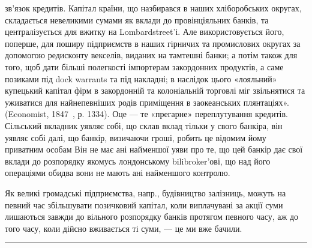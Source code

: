 зв’язок кредитів. Капітал країни, що назбирався в наших хліборобських
округах, складається невеликими сумами як вклади до провінціяльних банків,
та централізується для вжитку на Lombardstreet’i. Але використовується його,
поперше, для поширу підприємств в наших гірничих та промислових округах за
допомогою редисконту векселів, виданих на тамтешні банки; а потім також для того,
щоб дати більші полегкості імпортерам закордонних продуктів, а саме позиками
під dock warrants та під накладні; в наслідок цього «лояльний» купецький
капітал фірм в закордонній та колоніальній торговлі міг звільнятися та уживатися
для найнепевніших родів приміщення в заокеанських плянтаціях». (Economist,
1847~, р. 1334). Оце — те «прегарне» переплутування кредитів. Сільський
вкладник уявляє собі, що склав вклад тільки у свого банкіра, він уявляє собі
далі, що банкір, визичаючи гроші, робить це відомим йому приватним особам
Він не має ані найменшої уяви про те, що цей банкір дає свої вклади до розпорядку
якомусь лондонському bilibroker’ові, що над його операціями обидва
вони не мають ані найменшого контролю.

Як великі громадські підприємства, напр., будівництво залізниць, можуть
на певний час збільшувати позичковий капітал, коли виплачувані за акції
суми лишаються завжди до вільного розпорядку банків протягом певного часу,
аж до того часу, коли дійсно вживається ті суми, — це ми вже бачили.
\pfbreak
